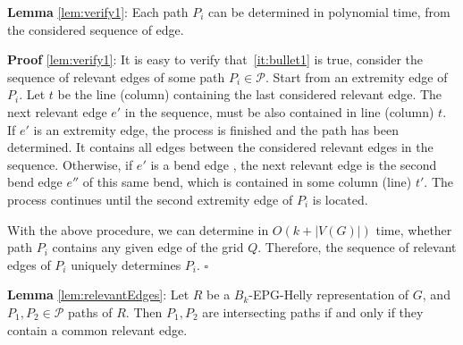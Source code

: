 \documentclass[9pt]{entcs}
\begin{document}
%

\begin{lema*}\textbf{Lemma} \ref{lem:verify1}:
Each path $P_i$ can be determined in polynomial time, from the considered sequence of edge.
\end{lema*}

\begin{prove*}\textbf{Proof} \ref{lem:verify1}: 
It is easy to verify that~\ref{it:bullet1} is true, consider the sequence of relevant edges of some path $P_i\in \mathcal{P}$. Start from an extremity edge of $P_i$. Let $t$ be the line (column) containing the last considered relevant edge. The next relevant edge $e'$ in the sequence, must be also contained in line (column) $t$. If $e'$ is an extremity edge, the process is finished and the path has been determined. It contains all edges between the considered relevant edges in the sequence. Otherwise, if $e'$ is a bend edge , the next relevant edge is the second bend edge $e''$ of this same bend, which is contained in some column (line) $t'$. The process continues until the second extremity edge of $P_i$ is located.   

With the above procedure, we can determine in $O(k+|V(G)|)$ time, whether path $P_i$ contains any given edge of the grid $Q$. Therefore, the sequence of relevant edges of $P_i$ uniquely determines $P_i$.
$\square$ \end{prove*}


\begin{lema*}
\textbf{Lemma} \ref{lem:relevantEdges}:
Let $R$ be a $B_k$-EPG-Helly representation of $G$, and $P_1, P_2 \in \mathcal{P}$ paths of $R$. Then $P_1, P_2$ are intersecting paths if and only if they contain a common relevant edge.
\end{lema*}
\end{document}
